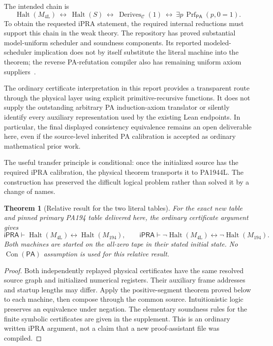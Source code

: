 \documentclass[10pt,letterpaper]{article}
\newtheorem{theorem}{Theorem}[section]
\newcommand{\ipra}{\mathsf{iPRA}}
\newcommand{\pa}{\mathsf{PA}}
\newcommand{\Con}{\operatorname{Con}}
\newcommand{\Halt}{\operatorname{Halt}}
\newcommand{\NewM}{M_{\mathrm{4L}}}
\newcommand{\OldM}{M_{194}}
\begin{document}
The intended chain is
\[
 \Halt(\NewM)\ \longleftrightarrow\ \Halt(S)
 \ \longleftrightarrow\ \operatorname{Derives}_{\mathcal C}(1)
 \ \longleftrightarrow\ \exists p\,\operatorname{Prf}_{\pa}(p,0=1).
\]
To obtain the requested iPRA statement, the required internal reductions
must support this chain in the weak theory. The repository has proved
substantial model-uniform scheduler and soundness components. Its
reported modeled-scheduler implication does not by itself substitute
the literal machine into the theorem; the reverse PA-refutation
compiler also has remaining uniform axiom suppliers~\cite{fairness,audit}.

The ordinary certificate interpretation in this report provides a
transparent route through the physical layer using explicit
primitive-recursive functions. It does not supply the outstanding
arbitrary PA induction-axiom translator or silently identify every
auxiliary representation used by the existing Lean endpoints. In
particular, the final displayed consistency equivalence remains an
open deliverable here, even if the source-level inherited PA
calibration is accepted as ordinary mathematical prior work.

The useful transfer principle is conditional: once the initialized
source has the required iPRA calibration, the physical theorem transports
it to PA1944L. The construction has preserved the difficult logical
problem rather than solved it by a change of names.

\begin{theorem}[Relative result for the two literal tables]
For the exact new table and pinned primary PA194 table delivered here,
the ordinary certificate argument gives
\[
 \ipra\vdash\Halt(\NewM)\leftrightarrow\Halt(\OldM),
 \qquad
 \ipra\vdash\neg\Halt(\NewM)\leftrightarrow\neg\Halt(\OldM).
\]
Both machines are started on the all-zero tape in their stated initial
state. No $\Con(\pa)$ assumption is used for this relative result.
\end{theorem}
\begin{proof}
Both independently replayed physical certificates have the same resolved
source graph and initialized numerical registers. Their auxiliary frame
addresses and startup lengths may differ. Apply the positive-segment
theorem proved below to each machine, then compose through the common
source. Intuitionistic logic preserves an equivalence under negation.
The elementary soundness rules for the finite symbolic certificates are
given in the supplement. This is an ordinary written iPRA argument,
not a claim that a new proof-assistant file was compiled.
\end{proof}
\end{document}
